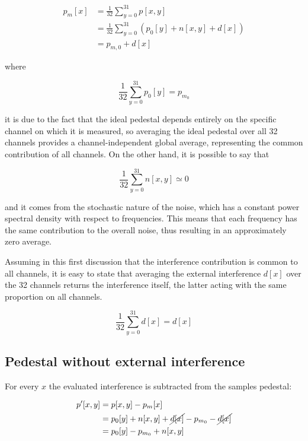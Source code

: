 \begin{equation} \label{eq2}
    \begin{split}
        p_m[x] & = \frac{1}{32} \sum_{y=0}^{31} p[x,y] \\
        & = \frac{1}{32} \sum_{y=0}^{31} (p_0[y] + n[x, y] + d[x]) \\
        & = p_{m, 0} + d[x]
    \end{split}
\end{equation}

\noindent
where

\begin{equation}
     \frac{1}{32} \sum_{y=0}^{31} p_0[y] = p_{m_0}
\end{equation}

\noindent
it is due to the fact that the ideal pedestal depends entirely on the specific channel on which it is measured, so averaging the ideal pedestal over all 32 channels provides a channel-independent global average, representing the common contribution of all channels. On the other hand, it is possible to say that

\begin{equation}
     \frac{1}{32} \sum_{y=0}^{31} n[x,y] \simeq 0
\end{equation}

\noindent
and it comes from the stochastic nature of the noise, which has a constant power spectral density with respect to frequencies. This means that each frequency has the same contribution to the overall noise, thus resulting in an approximately zero average.

\par
Assuming in this first discussion that the interference contribution is common to all channels, it is easy to state that averaging the external interference $d[x]$ over the 32 channels returns the interference itself, the latter acting with the same proportion on all channels.

\begin{equation}
     \frac{1}{32} \sum_{y=0}^{31} d[x] = d[x]
\end{equation}

\subsection{Pedestal without external interference}

For every $x$ the evaluated interference is subtracted from the samples pedestal:

\begin{equation}
    \begin{split}
        p'[x,y] & = p[x,y] - p_m[x] \\
        & = p_0[y] + n[x,y] + \cancel{d[x]} - p_{m_0} - \cancel{d[x]} \\
        & = p_0[y] - p_{m_0} + n[x,y]
    \end{split}
\end{equation}


